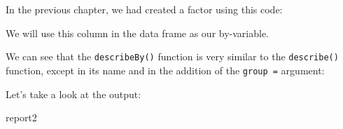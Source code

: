 \documentclass[
]{article}
\newenvironment{Shaded}{\begin{snugshade}}{\end{snugshade}}
\newcommand{\DataTypeTok}[1]{\textcolor[rgb]{0.13,0.29,0.53}{#1}}
\newcommand{\DecValTok}[1]{\textcolor[rgb]{0.00,0.00,0.81}{#1}}
\newcommand{\KeywordTok}[1]{\textcolor[rgb]{0.13,0.29,0.53}{\textbf{#1}}}
\newcommand{\NormalTok}[1]{#1}
\newcommand{\OperatorTok}[1]{\textcolor[rgb]{0.81,0.36,0.00}{\textbf{#1}}}
\newcommand{\StringTok}[1]{\textcolor[rgb]{0.31,0.60,0.02}{#1}}
\begin{document}
In the previous chapter, we had created a factor using this code:

\begin{Shaded}
\end{Shaded}

We will use this column in the data frame as our by-variable.

We can see that the \texttt{describeBy()} function is very similar to the \texttt{describe()} function, except in its name and in the addition of the \texttt{group\ =} argument:

\begin{Shaded}
\end{Shaded}

Let's take a look at the output:

\begin{Shaded}
\begin{Highlighting}[]
\NormalTok{report2}
\end{Highlighting}
\end{Shaded}
\end{document}
